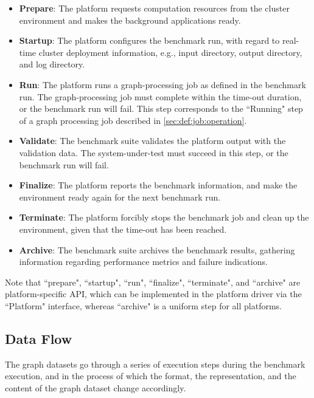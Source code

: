 \begin{itemize}
    \item \textbf{Prepare}: The platform requests computation resources from the cluster environment and makes the background applications ready.
    
    \item \textbf{Startup}: The platform configures the benchmark run, with regard to real-time cluster deployment information, e.g., input directory, output directory, and log directory.
    
    \item \textbf{Run}: The platform runs a graph-processing job as defined in the benchmark run. The graph-processing job must complete within the time-out duration, or the benchmark run will fail. This step corresponds to the ``Running" step of a graph processing job described in \ref{sec:def:job:operation}.
    
    \item \textbf{Validate}: The benchmark suite validates the platform output with the validation data. The system-under-test must succeed in this step, or the benchmark run will fail.
    
    \item \textbf{Finalize}: The platform reports the benchmark information, and make the environment ready again for the next benchmark run.
    
    \item \textbf{Terminate}: The platform forcibly stops the benchmark job and clean up the environment, given that the time-out has been reached. 
    
    \item \textbf{Archive}: The benchmark suite archives the benchmark results, gathering information regarding performance metrics and failure indications.
\end{itemize}

Note that ``prepare", ``startup", ``run", ``finalize", ``terminate", and ``archive" are platform-specific API, which can be implemented in the platform driver via the ``Platform" interface, whereas ``archive" is a uniform step for all platforms. 


\subsection{Data Flow}
\label{sec:process:execution:data_flow}
The graph datasets go through a series of execution steps during the benchmark execution, and in the process of which the format, the representation, and the content of the graph dataset change accordingly.

